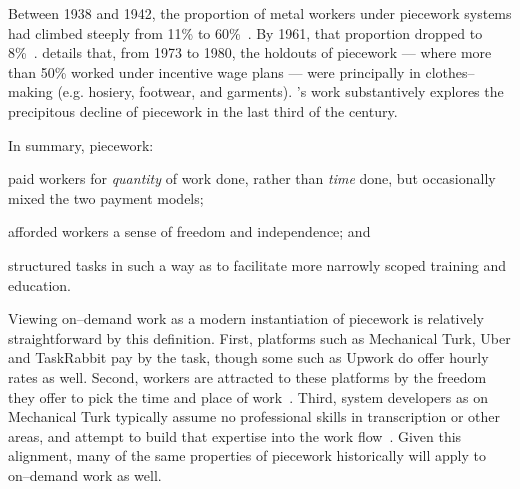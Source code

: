 \documentclass[trackingWork]{subfiles}
\begin{document}
Between 1938 and 1942, the proportion of metal workers under piecework systems had climbed steeply from 11\% to 60\%~\cite{hart2005piecework}.
By 1961, that proportion dropped to 8\%~\cite{carlson1982time}.
\citeauthor{carlson1982time} details that, from 1973 to 1980, the holdouts of piecework
--- where more than 50\% worked under incentive wage plans ---
were principally in clothes--making (e.g. hosiery, footwear, and garments).
\citeauthor{hart2013rise}'s work substantively explores the precipitous decline of piecework in the last third of the  century.



In summary, piecework:
\begin{inlinelist}
  \item paid workers for \textit{quantity} of work done, rather than \textit{time} done,
        but occasionally mixed the two payment models;
  \item afforded workers a sense of freedom and independence; and
  \item structured tasks in such a way as to facilitate more narrowly scoped training and education.
\end{inlinelist}


Viewing on--demand work as a modern instantiation of piecework is relatively straightforward by this definition.
First, platforms such as Mechanical Turk, Uber and TaskRabbit pay by the task, though some such as Upwork do offer hourly rates as well.
Second, workers are attracted to these platforms by the freedom they offer to pick the time and place of work~\cite{martin2014being,whyWouldAnyoneBrewer}.
Third, system developers as on Mechanical Turk typically assume no professional skills in transcription or other areas, and attempt to build that expertise into the work flow~\cite{noronha2011platemate,bernsteinSoylent}.
Given this alignment, many of the same properties of piecework historically will apply to on--demand work as well. 
\end{document}
